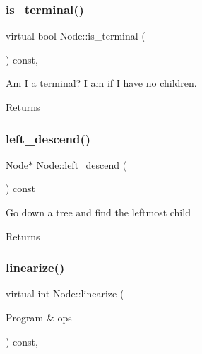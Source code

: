 \subsubsection{\texorpdfstring{is\+\_\+terminal()}{is\_terminal()}}
{\footnotesize\ttfamily virtual bool Node\+::is\+\_\+terminal (\begin{DoxyParamCaption}{ }\end{DoxyParamCaption}) const\hspace{0.3cm}{\ttfamily [inline]}, {\ttfamily [virtual]}}

Am I a terminal? I am if I have no children. \begin{DoxyReturn}{Returns}

\end{DoxyReturn}
\mbox{\label{class_node_ac6d1a1d71a28168b34e9092568570738}} 
\subsubsection{\texorpdfstring{left\+\_\+descend()}{left\_descend()}}
{\footnotesize\ttfamily \hyperlink{class_node}{Node}$\ast$ Node\+::left\+\_\+descend (\begin{DoxyParamCaption}{ }\end{DoxyParamCaption}) const\hspace{0.3cm}{\ttfamily [inline]}}

Go down a tree and find the leftmost child \begin{DoxyReturn}{Returns}

\end{DoxyReturn}
\mbox{\label{class_node_a54676f34db2c299693c9b55148589230}} 
\subsubsection{\texorpdfstring{linearize()}{linearize()}}
{\footnotesize\ttfamily virtual int Node\+::linearize (\begin{DoxyParamCaption}\item[{Program \&}]{ops }\end{DoxyParamCaption}) const\hspace{0.3cm}{\ttfamily [inline]}, {\ttfamily [virtual]}}


